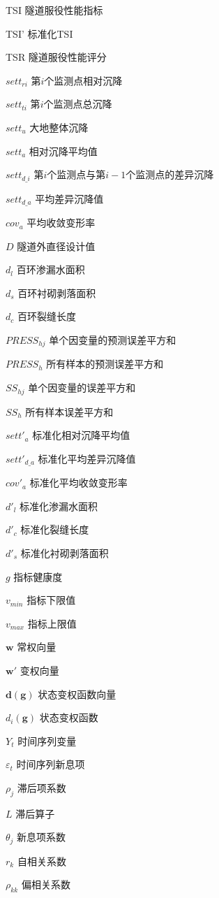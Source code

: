 \begin{denotation}
\begin{multicols}{2}
	\item[TSI] 隧道服役性能指标
	\item[TSI'] 标准化TSI
	\item[TSR] 隧道服役性能评分
	\item[${sett}_{ri}$] 第$i$个监测点相对沉降
	\item[${sett}_{ti}$] 第$i$个监测点总沉降
	\item[${sett}_{u}$] 大地整体沉降
	\item[${sett}_{a}$] 相对沉降平均值
	\item[${sett}_{d\_i}$] 第$i$个监测点与第$i-1$个监测点的差异沉降
	\item[${sett}_{d\_a}$] 平均差异沉降值
	\item[${cov}_{a}$] 平均收敛变形率
	\item[$D$] 隧道外直径设计值
	\item[${d}_{l}$] 百环渗漏水面积
	\item[${d}_{s}$] 百环衬砌剥落面积
	\item[${d}_{c}$] 百环裂缝长度
	\item[$PRESS_{hj}$] 单个因变量的预测误差平方和
	\item[${{PRESS}_{h}}$] 所有样本的预测误差平方和
	\item[${SS_{hj}}$] 单个因变量的误差平方和
	\item[${SS_{h}}$] 所有样本误差平方和
	\item[${set{{{{t}'}}_{a}}}$] 标准化相对沉降平均值
	\item[$set{{{t}'}_{d\_a}}$] 标准化平均差异沉降值
	\item[${co}{{{v}'}_{a}}$] 标准化平均收敛变形率
	\item[${{d}'_{l}}$] 标准化渗漏水面积
	\item[${{d}'_{c}}$] 标准化裂缝长度
	\item[${{{d}'}_{s}}$] 标准化衬砌剥落面积
	\item[$g$] 指标健康度
	\item[$v_{min}$] 指标下限值
	\item[$v_{max}$] 指标上限值
	\item[$\mathbf{w}$] 常权向量
	\item[$\mathbf{{w}'}$] 变权向量
	\item[$\mathbf{d}(\mathbf{g})$] 状态变权函数向量
	\item[${{d}_{i}}(\mathbf{g})$] 状态变权函数
	\item[$Y_t$] 时间序列变量
	\item[${\varepsilon }_{t}$] 时间序列新息项
	\item[${\rho }_{j}$] 滞后项系数
	\item[$L$] 滞后算子
	\item[${\theta }_{j}$] 新息项系数
	\item[${{r}_{k}}$] 自相关系数
	\item[${{\rho }_{kk}}$] 偏相关系数
\end{multicols}
\end{denotation}
